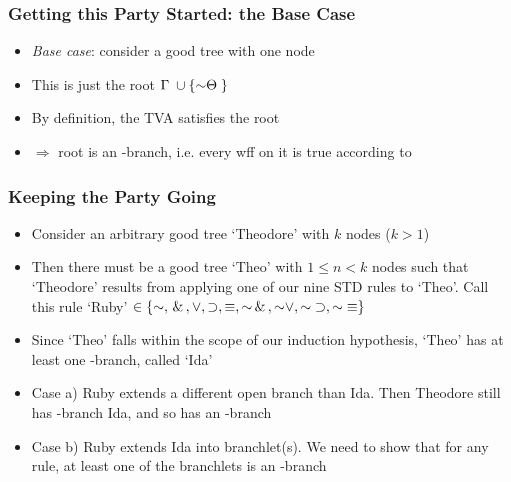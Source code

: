 \begin{frame}
\frametitle{Getting this Party Started: the Base Case}

\begin{itemize}[<+->]

\item \emph{Base case}: consider a good tree with one node

\item This is just the root $\GA \cup \{\enot \THA\}$

\item By definition, the TVA  satisfies the root 

\item $\Rightarrow$ root is an -branch, i.e. every wff on it is true according to 

\end{itemize}
\end{frame}

\begin{frame}
\frametitle{Keeping the Party Going}

\begin{itemize}[<+->]

\item Consider an arbitrary good tree `Theodore' with $k$ nodes ($k > 1$)

\item Then there must be a good tree `Theo'  with $1 \leq n < k$ nodes such that `Theodore' results from applying one of our nine STD rules to `Theo'. Call this rule `Ruby' $\in \{\enot, \eand, \eor, \eif, \eiff, \enot\eand, \enot\eor, \enot\eif, \enot\eiff \}$

\item Since `Theo' falls within the scope of our induction hypothesis, `Theo' has at least one -branch, called `Ida' 

\item Case a) Ruby extends a different open branch than Ida. Then Theodore still has -branch Ida, and so has an -branch

\item Case b) Ruby extends Ida into branchlet(s). We need to show that for any rule, at least one of the branchlets is an -branch

\end{itemize}
\end{frame}

